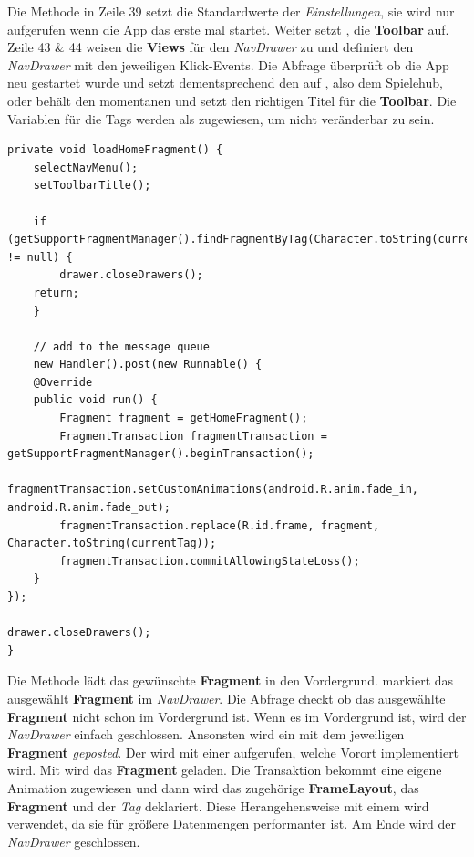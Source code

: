 Die Methode in Zeile 39 setzt die Standardwerte der \emph{Einstellungen}, sie
wird nur aufgerufen wenn die App das erste mal startet. Weiter setzt
, die \textbf{Toolbar} auf. Zeile 43 \& 44 weisen die
\textbf{Views} für den \emph{NavDrawer} zu und 
definiert den \emph{NavDrawer} mit den jeweiligen Klick-Events. Die
 Abfrage überprüft ob die App neu gestartet wurde und setzt
dementsprechend den  auf , also dem Spielehub,
oder behält den momentanen und setzt den richtigen Titel für die
\textbf{Toolbar}. Die Variablen für die Tags werden als 
zugewiesen, um nicht veränderbar zu sein.

\begin{lstlisting}[caption={Hub loadHomeFragment() Methode},captionpos=b]
private void loadHomeFragment() {
	selectNavMenu();
	setToolbarTitle();

	if (getSupportFragmentManager().findFragmentByTag(Character.toString(currentTag)) != null) {
		drawer.closeDrawers();
	return;
	}

	// add to the message queue
	new Handler().post(new Runnable() {
	@Override
	public void run() {
		Fragment fragment = getHomeFragment();
		FragmentTransaction fragmentTransaction = getSupportFragmentManager().beginTransaction();
		fragmentTransaction.setCustomAnimations(android.R.anim.fade_in, android.R.anim.fade_out);
		fragmentTransaction.replace(R.id.frame, fragment, Character.toString(currentTag));
		fragmentTransaction.commitAllowingStateLoss();
	}
});

drawer.closeDrawers();
}
\end{lstlisting}

Die Methode  lädt das gewünschte \textbf{Fragment} in den
Vordergrund.  markiert das ausgewählt \textbf{Fragment} im
\emph{NavDrawer}. Die  Abfrage checkt ob das ausgewählte 
\textbf{Fragment} nicht schon im Vordergrund ist. Wenn es im Vordergrund ist,
wird der \emph{NavDrawer} einfach geschlossen. Ansonsten wird ein 
mit dem jeweiligen \textbf{Fragment} \emph{geposted}. Der  wird
mit einer  aufgerufen, welche Vorort implementiert wird. Mit
 wird das \textbf{Fragment} geladen. Die Transaktion
bekommt eine eigene Animation zugewiesen und dann wird das zugehörige
\textbf{FrameLayout}, das \textbf{Fragment} und der \emph{Tag} deklariert. Diese
Herangehensweise mit einem  wird verwendet, da sie für größere
Datenmengen performanter ist. Am Ende wird der \emph{NavDrawer} geschlossen.

